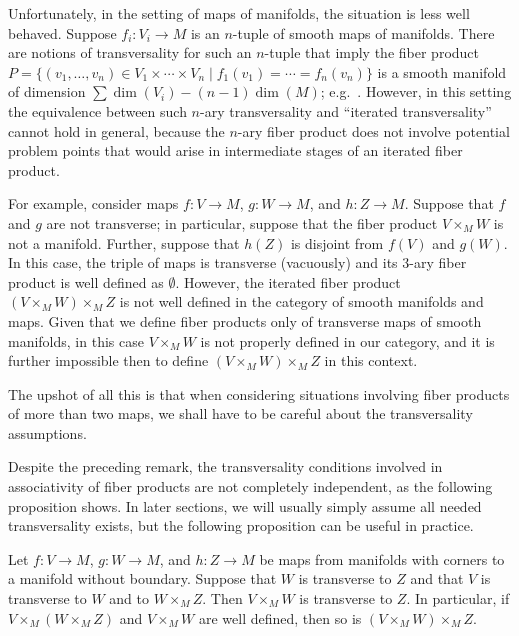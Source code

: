 \begin{remark}
	Unfortunately, in the setting of maps of manifolds, the situation is less well behaved.
	Suppose $f_i \colon V_i \to M$ is an $n$-tuple of smooth maps of manifolds.
	There are notions of transversality for such an $n$-tuple that imply the fiber product $P = \{(v_1,\ldots, v_n) \in V_1 \times \cdots \times V_n \mid f_1(v_1) = \cdots = f_n(v_n)\}$ is a smooth manifold of dimension $\sum\dim(V_i)-(n-1)\dim(M)$; e.g.\ \cite[Theorem 7.2.7]{MaDo92}.
	However, in this setting the equivalence between such $n$-ary transversality and ``iterated transversality'' cannot hold in general, because the $n$-ary fiber product does not involve potential problem points that would arise in intermediate stages of an iterated fiber product.

	For example, consider maps $f \colon V \to M$, $g \colon W \to M$, and $h \colon Z \to M$.
	Suppose that $f$ and $g$ are not transverse; in particular, suppose that the fiber product $V \times_MW$ is not a manifold.
	Further, suppose that $h(Z)$ is disjoint from $f(V)$ and $g(W)$.
	In this case, the triple of maps is transverse (vacuously) and its 3-ary fiber product is well defined as $\emptyset$.
	However, the iterated fiber product $(V \times_MW) \times_M Z$ is not well defined in the category of smooth manifolds and maps.
	Given that we define fiber products only of transverse maps of smooth manifolds, in this case $V \times_M W$ is not properly defined in our category, and it is further impossible then to define $(V \times_MW) \times_M Z$ in this context.

	The upshot of all this is that when considering situations involving fiber products of more than two maps, we shall have to be careful about the transversality assumptions.
\end{remark}

Despite the preceding remark, the transversality conditions involved in associativity of fiber products are not completely independent, as the following proposition shows. In later sections, we will usually simply assume all needed transversality exists, but the following proposition can be useful in practice.

\begin{proposition}\label{P: 3 out of 4 trans}
	Let $f \colon V \to M$, $g \colon W \to M$, and $h \colon Z \to M$ be maps from manifolds with corners to a manifold without boundary. Suppose that $W$ is transverse to $Z$ and that $V$ is transverse to $W$ and to $W \times_MZ$. Then $V \times_MW$ is transverse to $Z$. In particular, if $V \times_M(W \times_MZ)$ and $V \times_MW$ are well defined, then so is $(V \times_MW) \times_M Z$.
\end{proposition}

